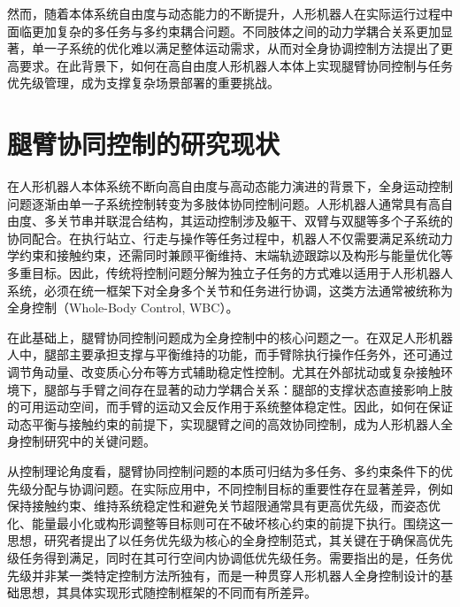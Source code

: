 然而，随着本体系统自由度与动态能力的不断提升，人形机器人在实际运行过程中面临更加复杂的多任务与多约束耦合问题。不同肢体之间的动力学耦合关系更加显著，单一子系统的优化难以满足整体运动需求，从而对全身协调控制方法提出了更高要求。在此背景下，如何在高自由度人形机器人本体上实现腿臂协同控制与任务优先级管理，成为支撑复杂场景部署的重要挑战。



\section{腿臂协同控制的研究现状}

在人形机器人本体系统不断向高自由度与高动态能力演进的背景下，全身运动控制问题逐渐由单一子系统控制转变为多肢体协同控制问题\cite{kajita2003biped,sardain2004forces}。人形机器人通常具有高自由度、多关节串并联混合结构，其运动控制涉及躯干、双臂与双腿等多个子系统的协同配合。在执行站立、行走与操作等任务过程中，机器人不仅需要满足系统动力学约束和接触约束，还需同时兼顾平衡维持、末端轨迹跟踪以及构形与能量优化等多重目标\cite{herzog2016momentum}。因此，传统将控制问题分解为独立子任务的方式难以适用于人形机器人系统，必须在统一框架下对全身多个关节和任务进行协调，这类方法通常被统称为全身控制（Whole-Body Control, WBC）\cite{sentis2005synthesis,escande2014hierarchical}。

在此基础上，腿臂协同控制问题成为全身控制中的核心问题之一\cite{stephens2011push,koolen2016design}。在双足人形机器人中，腿部主要承担支撑与平衡维持的功能，而手臂除执行操作任务外，还可通过调节角动量、改变质心分布等方式辅助稳定性控制\cite{orin2013centroidal}。尤其在外部扰动或复杂接触环境下，腿部与手臂之间存在显著的动力学耦合关系：腿部的支撑状态直接影响上肢的可用运动空间，而手臂的运动又会反作用于系统整体稳定性。因此，如何在保证动态平衡与接触约束的前提下，实现腿臂之间的高效协同控制，成为人形机器人全身控制研究中的关键问题\cite{pratt2006capture}。

从控制理论角度看，腿臂协同控制问题的本质可归结为多任务、多约束条件下的优先级分配与协调问题\cite{kanoun2011kinematic,del2015prioritized,liegeois1977automatic}。在实际应用中，不同控制目标的重要性存在显著差异，例如保持接触约束、维持系统稳定性和避免关节超限通常具有更高优先级，而姿态优化、能量最小化或构形调整等目标则可在不破坏核心约束的前提下执行\cite{mansard2007task}。围绕这一思想，研究者提出了以任务优先级为核心的全身控制范式，其关键在于确保高优先级任务得到满足，同时在其可行空间内协调低优先级任务。需要指出的是，任务优先级并非某一类特定控制方法所独有，而是一种贯穿人形机器人全身控制设计的基础思想，其具体实现形式随控制框架的不同而有所差异。


